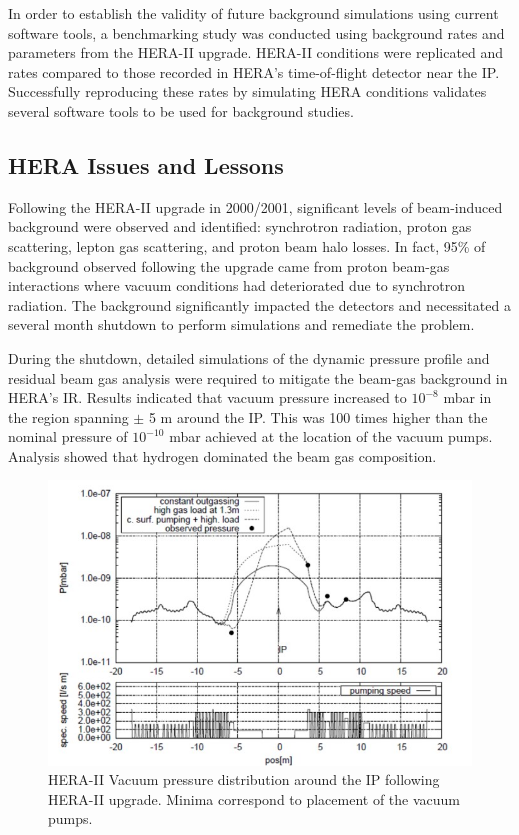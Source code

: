 In order to establish the validity of future background simulations using current software tools, a benchmarking study was conducted using background rates and parameters from the HERA-II upgrade.  HERA-II conditions were replicated and rates compared to those recorded in HERA's time-of-flight detector near the IP.  Successfully reproducing these rates by simulating HERA conditions validates several software tools to be used for background studies. 

\subsection{HERA Issues and Lessons}
Following the HERA-II upgrade in 2000/2001, significant levels of beam-induced background were observed and identified: synchrotron radiation, proton gas scattering, lepton gas scattering, and proton beam halo losses.   In fact, 95\% of background observed following the upgrade came from proton beam-gas interactions where vacuum conditions had deteriorated due to synchrotron radiation.  The background significantly impacted the detectors and necessitated a several month shutdown to perform simulations and remediate the problem.


During the shutdown, detailed simulations of the dynamic pressure profile and residual beam gas analysis were required to mitigate the beam-gas background in HERA's IR.  Results indicated that vacuum pressure increased to $10^{-8}$ mbar in the region spanning $\pm$ 5 m around the IP.   This  was 100 times higher than the nominal pressure of $10^{-10}$ mbar achieved at the location of the vacuum pumps. Analysis showed that hydrogen dominated the beam gas composition. 


\begin{figure}
	\centering
	\includegraphics[width=.75	\textwidth]{../../img/hera_badvac_regions.jpg}
	\caption{HERA-II Vacuum pressure distribution around the IP following HERA-II upgrade.  Minima correspond to placement of the vacuum pumps.}
	\label{fig:hera1}
\end{figure}
		
